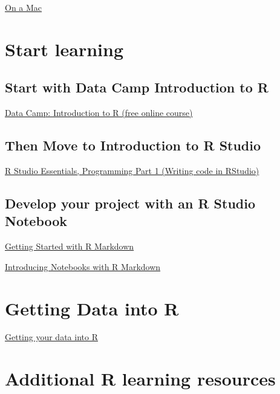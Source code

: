 \documentclass[]{book}
\begin{document}
\href{https://medium.com/@sorenlind/create-pdf-reports-using-r-r-markdown-latex-and-knitr-on-macos-high-sierra-e7b5705c9fd}{On
a Mac}

\section{Start learning}\label{start-learning}

\subsection{Start with Data Camp Introduction to
R}\label{start-with-data-camp-introduction-to-r}

\href{https://www.datacamp.com/courses/free-introduction-to-r}{Data
Camp: Introduction to R (free online course)}

\subsection{Then Move to Introduction to R
Studio}\label{then-move-to-introduction-to-r-studio}

\href{https://www.rstudio.com/resources/webinars/rstudio-essentials-webinar-series-part-1/}{R
Studio Essentials, Programming Part 1 (Writing code in RStudio)}

\subsection{Develop your project with an R Studio
Notebook}\label{develop-your-project-with-an-r-studio-notebook}

\href{https://www.rstudio.com/resources/webinars/getting-started-with-r-markdown/}{Getting
Started with R Markdown}

\href{https://www.rstudio.com/resources/webinars/introducing-notebooks-with-r-markdown/}{Introducing
Notebooks with R Markdown}

\section{Getting Data into R}\label{getting-data-into-r}

\href{https://www.rstudio.com/resources/webinars/getting-your-data-into-r/}{Getting
your data into R}

\section{Additional R learning
resources}\label{additional-r-learning-resources}
\end{document}
